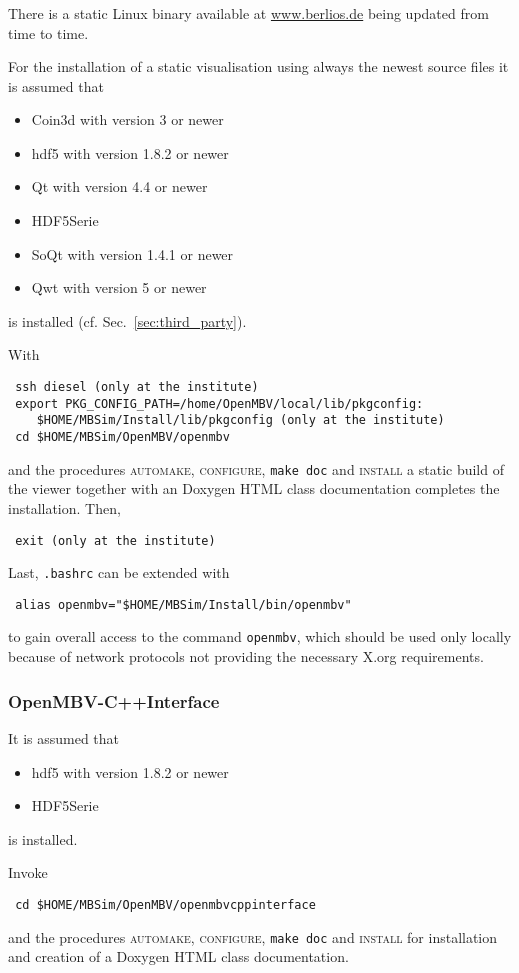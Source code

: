 \subsubsection{\OpenMBV{}}
There is a static Linux binary available at \url{www.berlios.de} being updated from time to time.\par
For the installation of a static visualisation using always the newest source files it is assumed that
\begin{itemize}
\item Coin3d with version 3 or newer 
\item hdf5 with version 1.8.2 or newer 
\item Qt with version 4.4 or newer 
\item HDF5Serie 
\item SoQt with version 1.4.1 or newer 
\item Qwt with version 5 or newer 
\end{itemize}
is installed (cf. Sec.~\ref{sec:third_party}).\par
With
\begin{verbatim}
 ssh diesel (only at the institute)
 export PKG_CONFIG_PATH=/home/OpenMBV/local/lib/pkgconfig:
    $HOME/MBSim/Install/lib/pkgconfig (only at the institute)
 cd $HOME/MBSim/OpenMBV/openmbv
\end{verbatim} 
and the procedures \textsc{automake, configure}, \texttt{make doc} and \textsc{install} a static build of the viewer together with an Doxygen HTML class documentation completes the installation. Then,
\begin{verbatim}
 exit (only at the institute)
\end{verbatim}
Last, \texttt{.bashrc} can be extended with
\begin{verbatim}
 alias openmbv="$HOME/MBSim/Install/bin/openmbv"
\end{verbatim}
to gain overall access to the command \texttt{openmbv}, which should be used only locally because of network protocols not providing the necessary X.org requirements.

\subsubsection{OpenMBV-C++Interface}
It is assumed that 
\begin{itemize}
\item hdf5 with version 1.8.2 or newer
\item HDF5Serie 
\end{itemize}
is installed.\par
Invoke
\begin{verbatim}
 cd $HOME/MBSim/OpenMBV/openmbvcppinterface
\end{verbatim} 
and the procedures \textsc{automake, configure}, \texttt{make doc} and \textsc{install} for installation and creation of a Doxygen HTML class documentation. 

